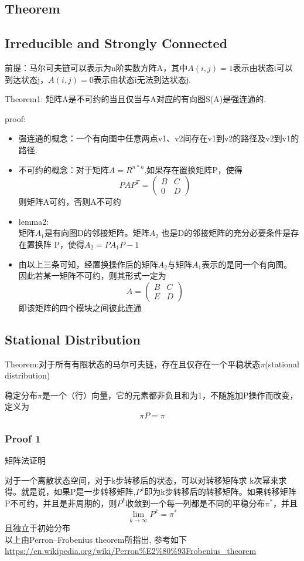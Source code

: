 \documentclass[a4paper, 11pt]{article} %
\begin{document}
\begin{small}
\section{Theorem}
\subsection{Irreducible and Strongly Connected}
前提：马尔可夫链可以表示为n阶实数方阵A，其中$A(i,j)=1$表示由状态i可以到达状态j，$A(i,j)=0$表示由状态i无法到达状态j.

Theorem1: 矩阵A是不可约的当且仅当与A对应的有向图S(A)是强连通的.

proof:
\begin{itemize}
	\item 强连通的概念：一个有向图中任意两点v1、v2间存在v1到v2的路径及v2到v1的路径.
	\item 不可约的概念：对于矩阵$A=R^{n*n}$,如果存在置换矩阵P，使得
	$$
	  PAP^{T}=\begin{pmatrix} B & C \\ 0 & D \end{pmatrix}\quad
	$$
	则矩阵A可约，否则A不可约
	\item lemma2:\\
	矩阵$A_1$是有向图D的邻接矩阵。矩阵$A_2$
也是D的邻接矩阵的充分必要条件是存在置换阵
P，使得$A_2=PA_1P-1$
    \item 由以上三条可知，经置换操作后的矩阵$A_2$与矩阵$A_1$表示的是同一个有向图。因此若某一矩阵不可约，则其形式一定为
    $$
	  A=\begin{pmatrix} B & C \\ E & D \end{pmatrix}\quad
	$$
	即该矩阵的四个模块之间彼此连通
\end{itemize}
\subsection{Stational Distribution}
Theorem:对于所有有限状态的马尔可夫链，存在且仅存在一个平稳状态$\pi$(stational distribution)

稳定分布$\pi$是一个（行）向量，它的元素都非负且和为1，不随施加P操作而改变，定义为
$$
  \pi P= \pi
$$

\subsubsection{Proof 1}
矩阵法证明

对于一个离散状态空间，对于k步转移后的状态，可以对转移矩阵求 k次幂来求得。就是说，如果P是一步转移矩阵,$P^k$即为k步转移后的转移矩阵。如果转移矩阵P不可约，并且是非周期的，则$P^k$收敛到一个每一列都是不同的平稳分布$\pi ^{*}$，并且
$$
 \lim_{k\rightarrow \infty} P^k=\pi ^{*}
$$
且独立于初始分布\\
以上由Perron–Frobenius theorem所指出,
参考如下\\
\url{https://en.wikipedia.org/wiki/Perron%E2%80%93Frobenius_theorem}


\end{small}
\end{document}
